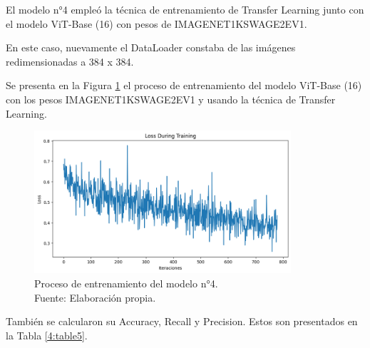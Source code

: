 El modelo n°4 empleó la técnica de entrenamiento de Transfer Learning junto con el modelo ViT-Base (16) con pesos de IMAGENET1KSWAGE2EV1.

En este caso, nuevamente el DataLoader constaba de las imágenes redimensionadas a 384 x 384.

Se presenta en la Figura \ref{4:fig126} el proceso de entrenamiento del modelo ViT-Base (16) con los pesos IMAGENET1KSWAGE2EV1 y usando la técnica de Transfer Learning.

\begin{figure}[H]
	\begin{center}
		\includegraphics[width=0.85\textwidth]{4/figures/model4_train.PNG}
		\caption[Proceso de entrenamiento del modelo n°4]{Proceso de entrenamiento del modelo n°4. \\
		Fuente: Elaboración propia.}
		\label{4:fig126}
	\end{center}
\end{figure}

También se calcularon su Accuracy, Recall y Precision. Estos son presentados en la Tabla \ref{4:table5}.

